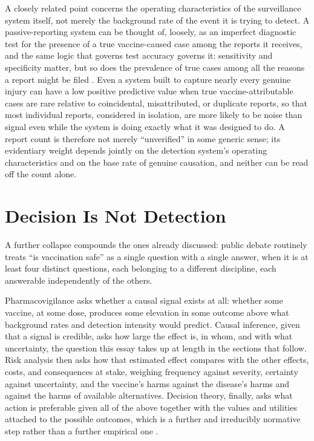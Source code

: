 \documentclass[11pt]{article}
\begin{document}
A closely related point concerns the operating characteristics of the surveillance system itself, not merely the background rate of the event it is trying to detect. A passive-reporting system can be thought of, loosely, as an imperfect diagnostic test for the presence of a true vaccine-caused case among the reports it receives, and the same logic that governs test accuracy governs it: sensitivity and specificity matter, but so does the prevalence of true cases among all the reasons a report might be filed \citep{broemeling2012}. Even a system built to capture nearly every genuine injury can have a low positive predictive value when true vaccine-attributable cases are rare relative to coincidental, misattributed, or duplicate reports, so that most individual reports, considered in isolation, are more likely to be noise than signal even while the system is doing exactly what it was designed to do. A report count is therefore not merely ``unverified'' in some generic sense; its evidentiary weight depends jointly on the detection system's operating characteristics and on the base rate of genuine causation, and neither can be read off the count alone.

\section{Decision Is Not Detection}

A further collapse compounds the ones already discussed: public debate routinely treats ``is vaccination safe'' as a single question with a single answer, when it is at least four distinct questions, each belonging to a different discipline, each answerable independently of the others.

Pharmacovigilance asks whether a causal signal exists at all: whether some vaccine, at some dose, produces some elevation in some outcome above what background rates and detection intensity would predict. Causal inference, given that a signal is credible, asks how large the effect is, in whom, and with what uncertainty, the question this essay takes up at length in the sections that follow. Risk analysis then asks how that estimated effect compares with the other effects, costs, and consequences at stake, weighing frequency against severity, certainty against uncertainty, and the vaccine's harms against the disease's harms and against the harms of available alternatives. Decision theory, finally, asks what action is preferable given all of the above together with the values and utilities attached to the possible outcomes, which is a further and irreducibly normative step rather than a further empirical one \citep{smith2010}.
\end{document}
